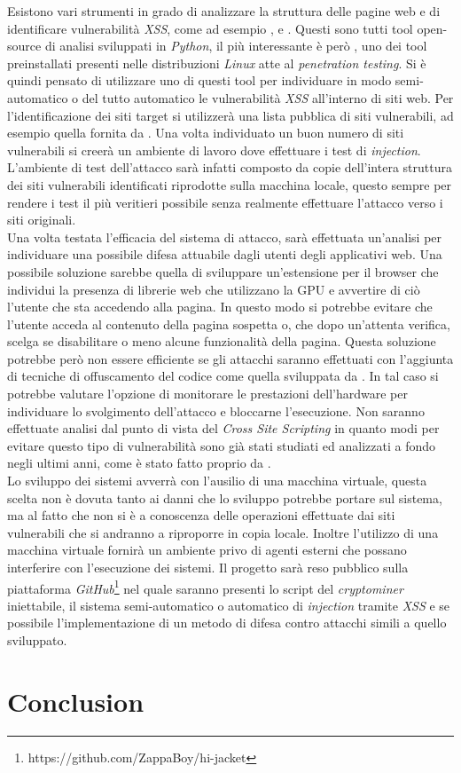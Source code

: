 \documentclass[conference]{IEEEtran}
\newcommand\citen[1]{\citeauthor{#1} \citep{#1}}
\newcommand\citetitlen[1]{\citetitle{#1} \citep{#1}}
\begin{document}
Esistono vari strumenti in grado di analizzare la struttura delle pagine web e di identificare vulnerabilità \emph{XSS}, come ad esempio \citetitlen{XSStrike}, \citetitlen{Traxss} e \citetitlen{XSSer}. Questi sono tutti tool open-source di analisi sviluppati in \emph{Python}, il più interessante è però , uno dei tool preinstallati presenti nelle distribuzioni \emph{Linux} atte al \emph{penetration testing}. Si è quindi pensato di utilizzare uno di questi tool per individuare in modo semi-automatico o del tutto automatico le vulnerabilità \emph{XSS} all'interno di siti web. Per l'identificazione dei siti target si utilizzerà una lista pubblica di siti vulnerabili, ad esempio quella fornita da \citen{xssed}. Una volta individuato un buon numero di siti vulnerabili si creerà un ambiente di lavoro dove effettuare i test di \emph{injection}. L'ambiente di test dell'attacco sarà infatti composto da copie dell'intera struttura dei siti vulnerabili identificati riprodotte sulla macchina locale, questo sempre per rendere i test il più veritieri possibile senza realmente effettuare l'attacco verso i siti originali.\\
Una volta testata l'efficacia del sistema di attacco, sarà effettuata un'analisi per individuare una possibile difesa attuabile dagli utenti degli applicativi web. Una possibile soluzione sarebbe quella di sviluppare un'estensione per il browser che individui la presenza di librerie web che utilizzano la GPU e avvertire di ciò l'utente che sta accedendo alla pagina. In questo modo si potrebbe evitare che l'utente acceda al contenuto della pagina sospetta o, che dopo un'attenta verifica, scelga se disabilitare o meno alcune funzionalità della pagina. Questa soluzione potrebbe però non essere efficiente se gli attacchi saranno effettuati con l'aggiunta di tecniche di offuscamento del codice come quella sviluppata da \citen{sharif2008impeding}. In tal caso si potrebbe valutare l'opzione di monitorare le prestazioni dell'hardware per individuare lo svolgimento dell'attacco e bloccarne l'esecuzione. Non saranno effettuate analisi dal punto di vista del \emph{Cross Site Scripting} in quanto modi per evitare questo tipo di vulnerabilità sono già stati studiati ed analizzati a fondo negli ultimi anni, come è stato fatto proprio da \citen{bisht2008xss}.\\
Lo sviluppo dei sistemi avverrà con l'ausilio di una macchina virtuale, questa scelta non è dovuta tanto ai danni che lo sviluppo potrebbe portare sul sistema, ma al fatto che non si è a conoscenza delle operazioni effettuate dai siti vulnerabili che si andranno a riproporre in copia locale. Inoltre l'utilizzo di una macchina virtuale fornirà un ambiente privo di agenti esterni che possano interferire con l'esecuzione dei sistemi. Il progetto sarà reso pubblico sulla piattaforma \emph{GitHub}\footnote{https://github.com/ZappaBoy/hi-jacket} nel quale saranno presenti lo script del \emph{cryptominer} iniettabile, il sistema semi-automatico o automatico di \emph{injection} tramite \emph{XSS} e se possibile l'implementazione di un metodo di difesa contro attacchi simili a quello sviluppato.

\section{Conclusion}\label{sec:conclusion}

\balance
\printbibliography
\vspace{12pt}
\end{document}
